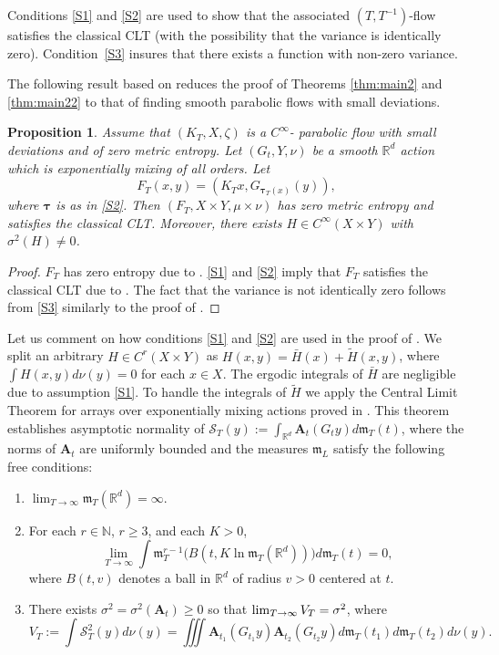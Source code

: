 \documentclass[JEP,XML,SOM,Unicode,NoFloatCountersInSection]{cedram}
\newenvironment{enumeratea}
{\bgroup\def\theenumi{\alph{enumi}}\begin{enumerate}}
{\end{enumerate}\egroup}
\let\DS\relax
\newcommand\cS{\mathcal{S}}
\newcommand\naturals{\mathbb{N}}\let\N\naturals
\newcommand\reals{\mathbb{R}}\let\R\reals
\newcommand\bA{\boldsymbol{A}}
\newcommand\btau{{\boldsymbol{\tau}}}
\newcommand\fm{\mathfrak{m}}
\theoremstyle{definition}
\theoremstyle{plain}
\newtheorem{proposition}[definition]{Proposition}
\begin{document}
Conditions \eqref{S1} and \eqref{S2} are used to show that the associated $(T,T^{-1})$-flow satisfies the classical CLT (with the possibility that the variance is identically zero). Condition~\eqref{S3}
insures that there exists a function with non-zero variance.

The following result based on \cite[Th.\,3.2]{DDKN} reduces the proof of
Theorems \ref{thm:main2} and \ref{thm:main22} to that of finding smooth parabolic flows with small deviations.

\begin{proposition}\label{prop:1} Assume that $(K_T,X,\zeta)$ is a $C^\infty$- parabolic flow with small deviations and of zero metric entropy. Let $(G_t,Y,\nu)$ be a smooth $\R^d$ action which is exponentially mixing of all orders. Let
\[
F_T(x,y)=(K_Tx, G_{\btau_T(x)}(y)),
\] where $\btau$ is as in \eqref{S2}. Then $(F_T,X\times Y,\mu \times \nu)$ has zero metric entropy and satisfies the classical CLT. Moreover, there exists $H\in C^\infty(X\times Y)$ with $\sigma^2(H)\neq 0$.
\end{proposition}
\begin{proof}
$F_T$ has zero entropy due to \cite[Lem.\,2.1]{DDKN}.
\eqref{S1} and \eqref{S2} imply that $F_T$ satisfies the classical CLT due to
\cite[Th.\,3.2]{DDKN}.
The fact that the variance is not identically zero follows from \eqref{S3} similarly
to the proof of \cite[Lem.\,8.2]{DDKN}.
\end{proof}

Let us comment on how conditions \eqref{S1} and \eqref{S2} are used in the proof of \cite[Th.\,3.2]{DDKN}. We split an arbitrary
$H\in C^r(X\times Y)$ as $H(x,y)=\bar{H}(x)+\tilde{H}(x,y)$,
where $\int H(x,y) d\nu(y)=0$ for each $x\in X$.
The ergodic integrals of $\bar{H}$ are negligible due to assumption \eqref{S1}.
To handle the integrals of $\tilde{H}$ we apply the Central Limit Theorem
for arrays over exponentially mixing actions proved in \cite{BG}.
This theorem establishes asymptotic normality of
$\cS_T(y):=\int_{\reals^d} \bA_t(G_t y) d\fm_T(t)$,
where the norms of $\bA_t$ are uniformly bounded and the measures
$\fm_L$ satisfy the following free conditions:

\begin{enumeratea}
\item\label{enum:a}
$\lim_{T\to\infty}
\fm_T(\R^d)=\infty$.

\item\label{enum:b}
For each $r\in \naturals$, $r\geq 3$, and each $K>0$,\vspace*{-3pt}
\[
\lim_{T\to \infty} \int \fm_T^{r-1}\Big(B(t,K\ln \fm_T(\reals^d))\Big) d\fm_T(t)=0,
\]
where $B(t,v)$ denotes a ball in $\R^d$ of radius $v>0$ centered at $t$.

\item\label{enum:c}
There exists $\sigma^2=\sigma^2(\bA_t)\geq 0 $ so that $\DS \lim_{T\to \infty} V_T=\sigma^2$, where\vspace*{-3pt}\enlargethispage{.5\baselineskip}
\[
V_T:=\int\cS_T^2(y)d\nu(y)= \iiint \bA_{t_1} (G_{t_1} y) \bA_{t_2} (G_{t_2} y) d\fm_T (t_1)
d\fm_T(t_2) d\nu(y).
\]
\end{enumeratea}
\end{document}
